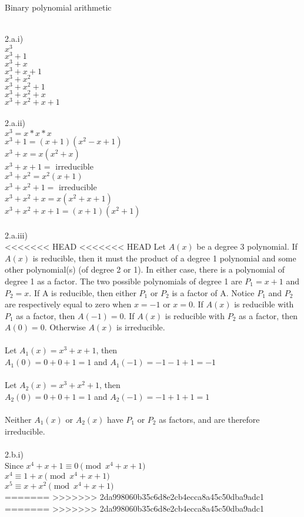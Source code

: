 \documentclass{assignment}
\newcommand\tab[1][0.5cm]{\hspace*{#1}}
\begin{document}
\begin{problemlist}
\pbitem Binary polynomial arithmetic
\begin{problem}
\begin{answer}
\\
2.a.i)\\
$x^3$\\
$x^3+1$\\
$x^3+x$\\
$x^3+x+1$\\
$x^3+x^2$\\
$x^3+x^2+1$\\
$x^3+x^2+x$\\
$x^3+x^2+x+1$\\
\\
2.a.ii)\\
$x^3=x*x*x$\\
$x^3+1=(x+1)(x^2-x+1)$\\
$x^3+x=x(x^2+x)$\\
$x^3+x+1=$ irreducible\\
$x^3+x^2=x^2(x+1)$\\
$x^3+x^2+1=$ irreducible\\
$x^3+x^2+x=x(x^2+x+1)$\\
$x^3+x^2+x+1=(x+1)(x^2+1)$\\
\\
2.a.iii)\\
<<<<<<< HEAD
<<<<<<< HEAD
Let $A(x)$ be a degree 3 polynomial.  If $A(x)$ is reducible, then it must the product of a degree 1 polynomial and some other polynomial(s) (of degree 2 or 1).  In either case, there is a polynomial of degree 1 as a factor.  The two possible polynomials of degree 1 are $P_1=x+1$ and $P_2=x$.  If A is reducible, then either $P_1$ or $P_2$ is a factor of A.  Notice $P_1$ and $P_2$ are respectively equal to zero when $x=-1$ or $x=0$.  If $A(x)$ is reducible with $P_1$ as a factor, then $A(-1)=0$.  If $A(x)$ is reducible with $P_2$ as a factor, then $A(0)=0$.  Otherwise $A(x)$ is irreducible.\\
\\
Let $A_1(x)=x^3+x+1$, then \\
\tab$A_1(0)=0+0+1=1$ and $A_1(-1)=-1-1+1=-1$\\
\\
Let $A_2(x)=x^3+x^2+1$, then \\
\tab$A_2(0)=0+0+1=1$ and $A_2(-1)=-1+1+1=1$\\
\\
Neither $A_1(x)$ or $A_2(x)$ have $P_1$ or $P_2$ as factors, and are therefore irreducible.\\
\\
2.b.i)\\
Since $x^4+x+1\equiv 0  \pmod{x^4+x+1}$\\
$x^4\equiv 1+x  \pmod{x^4+x+1}$\\
$x^5\equiv x+x^2  \pmod{x^4+x+1}$\\
=======
>>>>>>> 2da998060b35c6d8e2cb4ecca8a45c50dba9adc1
=======
>>>>>>> 2da998060b35c6d8e2cb4ecca8a45c50dba9adc1


\end{answer}
\end{problem}
\end{problemlist}
\end{document}
